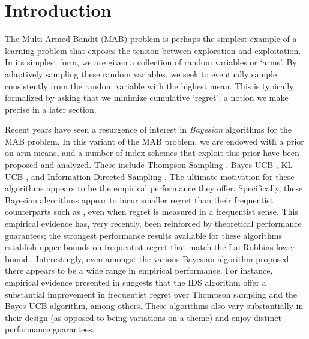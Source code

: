 \section{Introduction} \label{sec:intro}


The Multi-Armed Bandit (MAB) problem is perhaps the simplest example of a learning problem that exposes the tension between exploration and exploitation. In its simplest form, we are given a collection of random variables or `arms'. By adaptively sampling these random variables, we seek to eventually sample consistently from the random variable with the highest mean. This is typically formalized by asking that we minimize cumulative `regret'; a notion we make precise in a later section. 

Recent years have seen a resurgence of interest in {\em Bayesian} algorithms for the MAB problem. In this variant of the MAB problem, we are endowed with a prior on arm means, and a number of index schemes that exploit this prior have been proposed and analyzed. These include Thompson Sampling \citep{thompson1933likelihood}, Bayes-UCB \citep{kaufmann2012thompson}, KL-UCB \citep{garivier2011kl}, and Information Directed Sampling \citep{russo2014learning}. The ultimate motivation for these algorithms appears to be the empirical performance they offer. Specifically, these Bayesian algorithms appear to incur smaller regret than their frequentist counterparts such as \cite{auer2002finite}, even when regret is measured in a frequentist sense. This empirical evidence has, very recently, been reinforced by theoretical performance guarantees; the strongest performance results available for these algorithms establish upper bounds on frequentist regret that match the Lai-Robbins lower bound \citep{lai1985asymptotically}. Interestingly, even amongst the various Bayesian algorithm proposed there appears to be a wide range in empirical performance. For instance, empirical evidence presented in \cite{russo2014learning} suggests that the IDS algorithm offer a substantial improvement in frequentist regret over Thompson sampling and the Bayes-UCB algorithm, among others. These algorithms also vary substantially in their design (as opposed to being variations on a theme) and enjoy distinct performance guarantees.    

